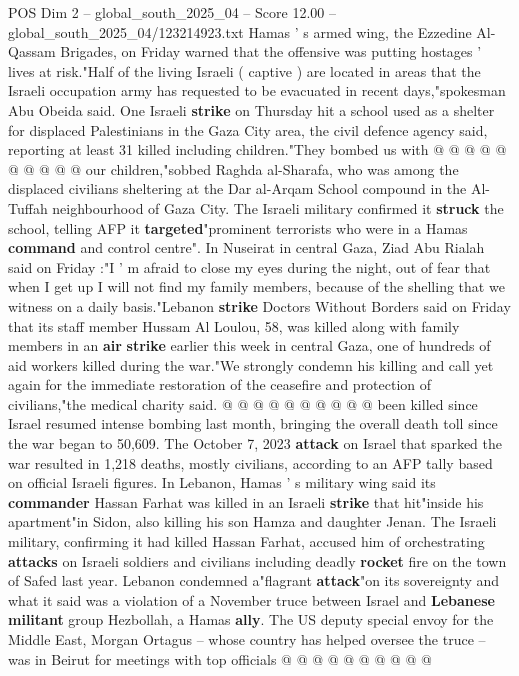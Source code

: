 \begin{textsample}{POS Dim 2 – global\_south\_2025\_04 – Score 12.00 – global\_south\_2025\_04/123214923.txt}
Hamas ' s armed wing, the Ezzedine Al-Qassam Brigades, on Friday warned that the offensive was putting hostages ' lives at risk."Half of the living Israeli ( captive ) are located in areas that the Israeli occupation army has requested to be evacuated in recent days,"spokesman Abu Obeida said.
One Israeli \textbf{strike} on Thursday hit a school used as a shelter for displaced Palestinians in the Gaza City area, the civil defence agency said, reporting at least 31 killed including children."They bombed us with @ @ @ @ @ @ @ @ @ @ our children,"sobbed Raghda al-Sharafa, who was among the displaced civilians sheltering at the Dar al-Arqam School compound in the Al-Tuffah neighbourhood of Gaza City.
The Israeli military confirmed it \textbf{struck} the school, telling AFP it \textbf{targeted}"prominent terrorists who were in a Hamas \textbf{command} and control centre".
In Nuseirat in central Gaza, Ziad Abu Rialah said on Friday :"I ' m afraid to close my eyes during the night, out of fear that when I get up I will not find my family members, because of the shelling that we witness on a daily basis."Lebanon \textbf{strike} Doctors Without Borders said on Friday that its staff member Hussam Al Loulou, 58, was killed along with family members in an \textbf{air} \textbf{strike} earlier this week in central Gaza, one of hundreds of aid workers killed during the war."We strongly condemn his killing and call yet again for the immediate restoration of the ceasefire and protection of civilians,"the medical charity said. @ @ @ @ @ @ @ @ @ @ been killed since Israel resumed intense bombing last month, bringing the overall death toll since the war began to 50,609.
The October 7, 2023 \textbf{attack} on Israel that sparked the war resulted in 1,218 deaths, mostly civilians, according to an AFP tally based on official Israeli figures.
In Lebanon, Hamas ' s military wing said its \textbf{commander} Hassan Farhat was killed in an Israeli \textbf{strike} that hit"inside his apartment"in Sidon, also killing his son Hamza and daughter Jenan.
The Israeli military, confirming it had killed Hassan Farhat, accused him of orchestrating \textbf{attacks} on Israeli soldiers and civilians including deadly \textbf{rocket} fire on the town of Safed last year.
Lebanon condemned a"flagrant \textbf{attack}"on its sovereignty and what it said was a violation of a November truce between Israel and \textbf{Lebanese} \textbf{militant} group Hezbollah, a Hamas \textbf{ally}.
The US deputy special envoy for the Middle East, Morgan Ortagus -- whose country has helped oversee the truce -- was in Beirut for meetings with top officials @ @ @ @ @ @ @ @ @ @

\end{textsample}
